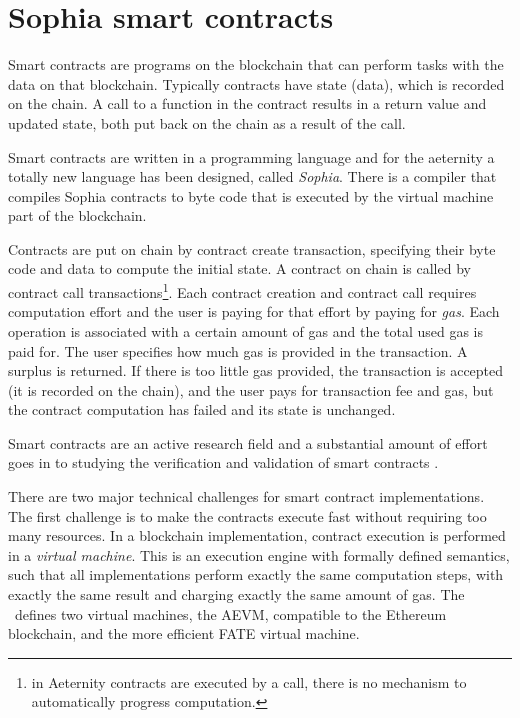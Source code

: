 \section{Sophia smart contracts}
\label{sect:sophia}

Smart contracts \cite{szabo1996smart,hhz007} are
programs on the blockchain that can perform tasks with the data on that
blockchain. Typically contracts have state (data), which is recorded on the
chain. A call to a function in the contract results in a return value
and updated state, both put back on the chain as a result of the
call.

Smart contracts are written in a programming language and for the
aeternity a totally new language has been designed, called
\textit{Sophia}. There is a compiler that compiles Sophia contracts to
byte code that is executed by the virtual machine part of the
blockchain.

Contracts are put on chain by contract create
transaction, specifying their byte code and data to compute the
initial state. A contract on chain is called by contract call transactions\footnote{in
  Aeternity  contracts are executed by a call, there is no
  mechanism to automatically progress computation.}. Each contract
creation and contract call requires computation effort and the user is paying
for that effort by paying for \textit{gas}. Each operation is
associated with a certain amount of gas and the total used gas is paid
for. The user specifies how much gas is provided in the transaction. A
surplus is returned. If there is too little gas provided, the
transaction is accepted (it is recorded
on the chain), and the user pays for transaction fee and gas,
but the contract computation has failed and its state is unchanged.

Smart contracts are an active research field
\cite{DBLP:journals/corr/abs-1710-06372} and a substantial amount of
  effort goes in to studying the verification and validation of smart contracts
  \cite{magazzeni2017validation,bhargavan2016formal}.

There are two major technical challenges for smart contract
implementations. The first challenge is to make the contracts
execute fast without requiring too many resources. In a blockchain
implementation, contract execution is performed in a
\textit{virtual machine}. This is an execution engine with formally
defined semantics, such that all implementations perform exactly the
same computation steps, with exactly the same result and charging
exactly the same amount of gas. The \blockchain\ defines two virtual
machines, the AEVM, compatible to the Ethereum blockchain, and the more
efficient FATE virtual machine.


